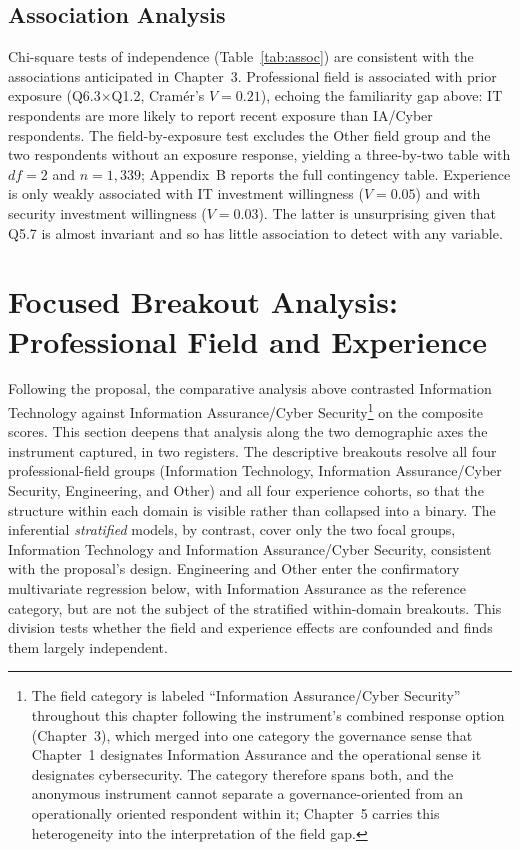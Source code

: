 \subsection{Association Analysis}

Chi-square tests of independence (Table~\ref{tab:assoc}) are consistent with the associations anticipated in Chapter~3. Professional field is associated with prior exposure (Q6.3$\times$Q1.2, Cram\'er's $V=0.21$), echoing the familiarity gap above: IT respondents are more likely to report recent exposure than IA/Cyber respondents. The field-by-exposure test excludes the Other field group and the two respondents without an exposure response, yielding a three-by-two table with $df=2$ and $n=1{,}339$; Appendix~B reports the full contingency table. Experience is only weakly associated with IT investment willingness ($V=0.05$) and with security investment willingness ($V=0.03$). The latter is unsurprising given that Q5.7 is almost invariant and so has little association to detect with any variable.



\section{Focused Breakout Analysis: Professional Field and Experience}

Following the proposal, the comparative analysis above contrasted Information Technology against Information Assurance/Cyber Security\footnote{The field category is labeled ``Information Assurance/Cyber Security'' throughout this chapter following the instrument's combined response option (Chapter~3), which merged into one category the governance sense that Chapter~1 designates Information Assurance and the operational sense it designates cybersecurity. The category therefore spans both, and the anonymous instrument cannot separate a governance-oriented from an operationally oriented respondent within it; Chapter~5 carries this heterogeneity into the interpretation of the field gap.} on the composite scores. This section deepens that analysis along the two demographic axes the instrument captured, in two registers. The descriptive breakouts resolve all four professional-field groups (Information Technology, Information Assurance/Cyber Security, Engineering, and Other) and all four experience cohorts, so that the structure within each domain is visible rather than collapsed into a binary. The inferential \emph{stratified} models, by contrast, cover only the two focal groups, Information Technology and Information Assurance/Cyber Security, consistent with the proposal's design. Engineering and Other enter the confirmatory multivariate regression below, with Information Assurance as the reference category, but are not the subject of the stratified within-domain breakouts. This division tests whether the field and experience effects are confounded and finds them largely independent.

